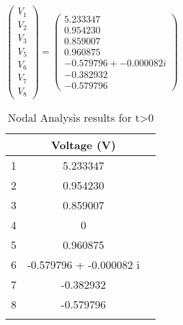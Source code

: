 $ \left(\begin{array}{c} V_1 \\ V_2 \\ V_3 \\ V_5 \\ V_6 \\ V_7 \\ V_8 \end{array}\right)= \left(\begin{array}{c} 5.233347 \\ 0.954230 \\ 0.859007 \\ 0.960875 \\ -0.579796 + -0.000082 i \\ -0.382932 \\ -0.579796 \end{array}\right) $
 \begin{table}[H]
 \footnotesize
 \centering
 \caption{Nodal Analysis results for t\textgreater0}
 \label{tab:tables}
 \begin{center}
 \begin{tabular}{ccc} 
 & Voltage (V)\\ 
 \hline 


 \hline 
 1 & 5.233347 \\ 
 \hline 
 2 & 0.954230 \\ 
 \hline 
 3 & 0.859007 \\ 
 \hline 
 4 & 0 \\ 
 \hline 
 5 & 0.960875 \\ 
 \hline 
 6 & -0.579796 + -0.000082 i \\ 
 \hline 
 7 & -0.382932 \\ 
 \hline 
 8 &  -0.579796 \\ 
 \hline 
 \\ 
  \end{tabular} 
 \end{center} 
 \end{table}